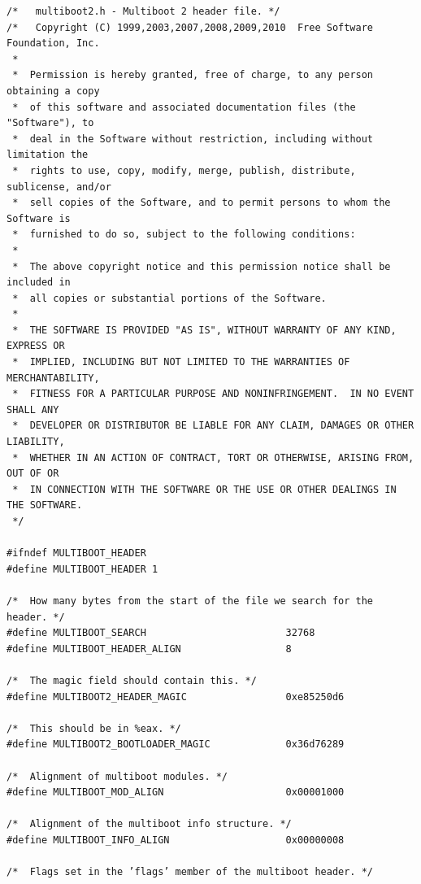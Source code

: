 \documentclass[../main.tex]{subfiles}
\begin{document}
\label{lst:multiboot2_h}
\begin{verbatim}
/*   multiboot2.h - Multiboot 2 header file. */
/*   Copyright (C) 1999,2003,2007,2008,2009,2010  Free Software Foundation, Inc.
 *
 *  Permission is hereby granted, free of charge, to any person obtaining a copy
 *  of this software and associated documentation files (the "Software"), to
 *  deal in the Software without restriction, including without limitation the
 *  rights to use, copy, modify, merge, publish, distribute, sublicense, and/or
 *  sell copies of the Software, and to permit persons to whom the Software is
 *  furnished to do so, subject to the following conditions:
 *
 *  The above copyright notice and this permission notice shall be included in
 *  all copies or substantial portions of the Software.
 *
 *  THE SOFTWARE IS PROVIDED "AS IS", WITHOUT WARRANTY OF ANY KIND, EXPRESS OR
 *  IMPLIED, INCLUDING BUT NOT LIMITED TO THE WARRANTIES OF MERCHANTABILITY,
 *  FITNESS FOR A PARTICULAR PURPOSE AND NONINFRINGEMENT.  IN NO EVENT SHALL ANY
 *  DEVELOPER OR DISTRIBUTOR BE LIABLE FOR ANY CLAIM, DAMAGES OR OTHER LIABILITY,
 *  WHETHER IN AN ACTION OF CONTRACT, TORT OR OTHERWISE, ARISING FROM, OUT OF OR
 *  IN CONNECTION WITH THE SOFTWARE OR THE USE OR OTHER DEALINGS IN THE SOFTWARE.
 */

#ifndef MULTIBOOT_HEADER
#define MULTIBOOT_HEADER 1

/*  How many bytes from the start of the file we search for the header. */
#define MULTIBOOT_SEARCH                        32768
#define MULTIBOOT_HEADER_ALIGN                  8

/*  The magic field should contain this. */
#define MULTIBOOT2_HEADER_MAGIC                 0xe85250d6

/*  This should be in %eax. */
#define MULTIBOOT2_BOOTLOADER_MAGIC             0x36d76289

/*  Alignment of multiboot modules. */
#define MULTIBOOT_MOD_ALIGN                     0x00001000

/*  Alignment of the multiboot info structure. */
#define MULTIBOOT_INFO_ALIGN                    0x00000008

/*  Flags set in the ’flags’ member of the multiboot header. */


\end{verbatim}
\end{document}
